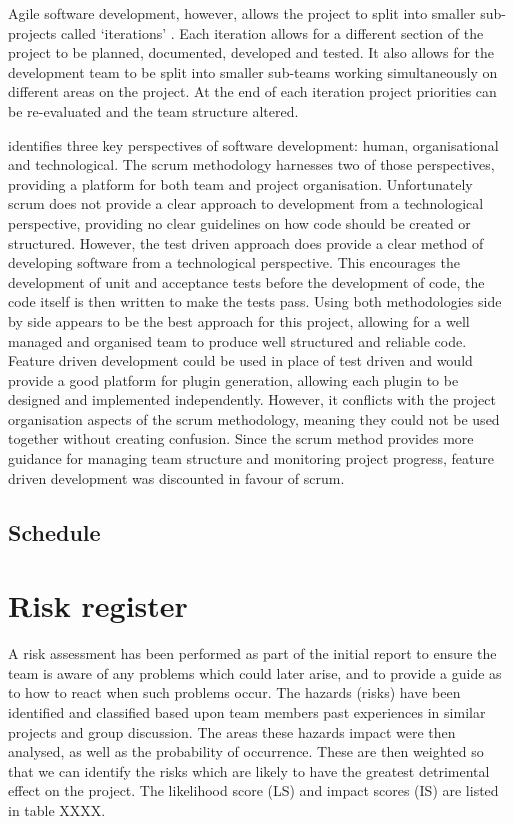 \documentclass[10pt,a4paper]{article}
\begin{document}
Agile software development, however, allows the project to split into smaller
sub-projects called `iterations' \cite{hazzan2008agile}. Each iteration allows
for a different section of the project to be planned, documented, developed and
tested. It also allows for the development team to be split into smaller
sub-teams working simultaneously on different areas on the project. At the end
of each iteration project priorities can be re-evaluated and the team structure
altered. 

\cite{hazzan2008agile} identifies three key perspectives of software
development: human, organisational and technological. The scrum methodology
harnesses two of those perspectives, providing a platform for both team and
project organisation. Unfortunately scrum does not provide a clear approach to
development from a technological perspective, providing no clear guidelines on
how code should be created or structured. However, the test driven approach does
provide a clear method of developing software from a technological perspective.
This encourages the development of unit and acceptance tests before the
development of code, the code itself is then written to make the tests pass.
Using both methodologies side by side appears to be the best approach for this
project, allowing for a well managed and organised team to produce well
structured and reliable code. Feature driven development could be used in place
of test driven and would provide a good platform for plugin generation, allowing
each plugin to be designed and implemented independently. However, it conflicts
with the project organisation aspects of the scrum methodology, meaning they
could not be used together without creating confusion. Since the scrum method
provides more guidance for managing team structure and monitoring project
progress, feature driven development was discounted in favour of scrum.

\subsection{Schedule}


\section{Risk register}
A risk assessment has been performed as part of the initial report to ensure the team is aware of any problems which could later arise, and to provide a guide as to how to react when such problems occur. The hazards (risks) have been identified and classified based upon team members past experiences in similar projects and group discussion. The areas these hazards impact were then analysed, as well as the probability of occurrence. These are then weighted so that we can identify the risks which are likely to have the greatest detrimental effect on the project. The likelihood score (LS) and impact scores (IS) are listed in table XXXX. %
\end{document}
